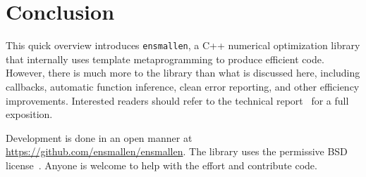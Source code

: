 \documentclass[twoside,11pt]{article}
\begin{document}
\section{Conclusion}
\label{sec:conclusion}

This quick overview introduces {\tt ensmallen}, a C++ numerical optimization
library that internally uses template metaprogramming to produce efficient code.
However, there is much more to the library than what is discussed here,
including callbacks, automatic function inference, clean error reporting, and
other efficiency improvements.  Interested readers should refer to the technical
report~\citep{ensmallen2020} for a full exposition.


Development is done in an open manner at \mbox{\url{https://github.com/ensmallen/ensmallen}}.
The library uses the permissive BSD license~\citep{Laurent_2008}.
Anyone is welcome to help with the effort and contribute code.




\end{document}
